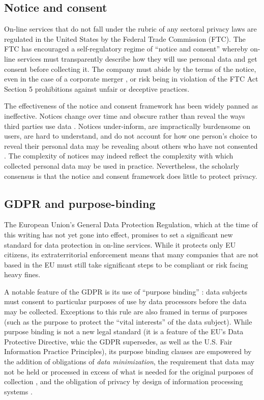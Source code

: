 \documentclass[../thesis.tex]{subfiles}
\begin{document}
\subsection{Notice and consent}

On-line services that do
not fall under the rubric of any sectoral privacy
laws are regulated in the United States by the
Federal Trade Commission (FTC).
The FTC has encouraged a self-regulatory regime
of ``notice and consent'' whereby on-line services
must transparently describe how they will use
personal data and get consent before collecting it.
The company must abide by the terms of the notice,
even in the case of a corporate merger \cite{hine_2015},
or risk being in violation of the FTC Act Section 5
prohibitions against unfair or deceptive practices. 

The effectiveness of the notice and consent framework
has been widely panned as ineffective.
Notices change over time and obscure rather than reveal
the ways third parties use data \cite{barocas2009notice}.
Notices under-inform, are impractically burdensome on users,
are hard to understand, and do not account for how
one person's choice to reveal their personal data
may be revealing about others who have not consented
\cite{reidenberg2015privacy} \cite{solove2012introduction}.
The complexity of notices may indeed reflect the complexity
with which collected personal data may be used
\cite{schaub2015design} in practice.
Nevertheless, the scholarly consensus is that
the notice and consent framework does little to
protect privacy.

\subsection{GDPR and purpose-binding}
\label{sec:GDPR}

The European Union's General Data Protection Regulation,
which at the time of this writing has not yet gone into
effect, promises to set a significant new standard for
data protection in on-line services.
While it protects only EU citizens, its extraterritorial
enforcement means that many companies that are not based in
the EU must still take significant steps to be compliant
or risk facing heavy fines.

A notable feature of the GDPR is its use of ``purpose binding''
\cite{hildebrandt2013slaves} \cite{herrmann2016privacy}:
data subjects must consent to particular purposes of use
by data processors before the data may be collected.
Exceptions to this rule are also framed in terms of purposes
(such as the purpose to protect the ``vital interests''
of the data subject).
While purpose binding is not a new legal standard
(it is a feature of the EU's Data Protective Directive,
whic the GDPR supersedes, as well as the U.S. Fair
Information Practice Principles), its purpose binding
clauses are empowered by the addition of 
obligations of \emph{data minimization},
the requirement
that data may not be held or processed in excess of what
is needed for the original purposes of
collection \cite{gurses2011engineering},
and the obligation of privacy by design of information
processing systems \cite{danezis2015privacy}.
\end{document}
